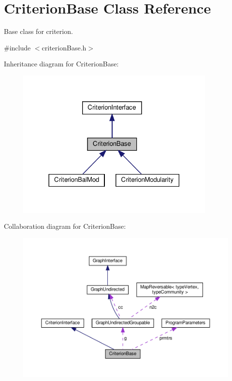 \hypertarget{classCriterionBase}{}\section{Criterion\+Base Class Reference}
\label{classCriterionBase}


Base class for criterion.  




{\ttfamily \#include $<$criterion\+Base.\+h$>$}



Inheritance diagram for Criterion\+Base\+:
\nopagebreak
\begin{figure}[H]
\begin{center}
\leavevmode
\includegraphics[width=282pt]{classCriterionBase__inherit__graph}
\end{center}
\end{figure}


Collaboration diagram for Criterion\+Base\+:
\nopagebreak
\begin{figure}[H]
\begin{center}
\leavevmode
\includegraphics[width=350pt]{classCriterionBase__coll__graph}
\end{center}
\end{figure}
